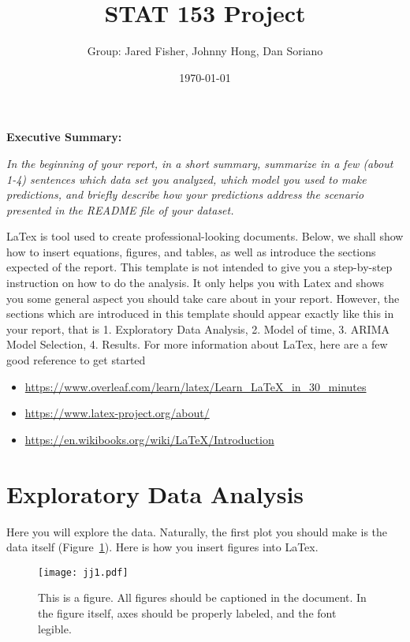 \documentclass[a4paper]{article}
\title{STAT 153 Project}
\author{Group: Jared Fisher, Johnny Hong, Dan Soriano}
\date{\today}
\begin{document}
\maketitle

\noindent\textbf{Executive Summary:}

\textit{In the beginning of your report, in a short summary, summarize in a few (about 1-4) sentences which data set you analyzed, which model you used to make predictions, and briefly describe how your predictions address the scenario presented in the README file of your dataset. }

LaTex is tool used to create professional-looking documents. Below, we shall show
how to insert equations, figures, and tables, as well as introduce
the sections expected of the report.
%
This template is not intended to give you a step-by-step instruction on how to do the analysis.
%
%
It only helps you with Latex and shows you some general aspect you should take care about in your report. 
%
However, the sections which are introduced in this template should appear exactly like this in your report, that is 1. Exploratory Data Analysis, 2. Model of time, 3. ARIMA Model Selection, 4. Results.
%
For more information about LaTex, here are a few good reference to get started
\begin{itemize}
\item \url{https://www.overleaf.com/learn/latex/Learn_LaTeX_in_30_minutes}
\item \url{https://www.latex-project.org/about/}
\item \url{https://en.wikibooks.org/wiki/LaTeX/Introduction}
\end{itemize}


\section{Exploratory Data Analysis}
Here you will explore the data. Naturally, the first plot you should make is the
data itself (Figure~\ref{fig:jj_data}). Here is how you insert figures into LaTex.

\begin{figure}[h!]
	\centering
	\texttt{[image: jj1.pdf]}
	\caption{This is a figure. All figures should be captioned in the document.
	In the figure itself, axes should be properly labeled, and the font legible. }
	\label{fig:jj_data}
\end{figure}
\end{document}
